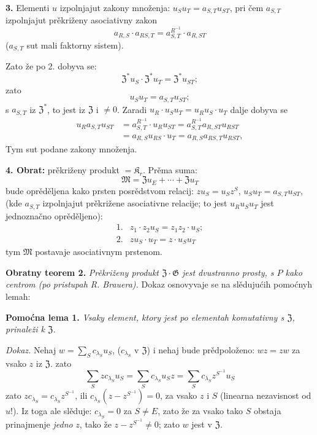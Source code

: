\documentclass[11pt]{article}
\begin{document}
\noindent\textbf{3.} Elementi \(u\) izpolnjajut zakony množenja: \(u_Su_T=a_{S,T}u_{ST}\), pri čem \(a_{S,T}\) izpolnjajut prěkriženy asociativny zakon
\[
a_{R,S}\cdot a_{RS,T}=a_{S,T}^{R^{-1}}\cdot a_{R,ST}
\]
(\(a_{S,T}\) sut mali faktorny sistem).

Zato že po 2. dobyva se:
\[
\mathfrak Z^*u_S\cdot\mathfrak Z^*u_T=\mathfrak Z^*u_{ST};
\]
zato
\[
u_Su_T=a_{S,T}u_{ST};
\]
s \(a_{S,T}\) iz \(\mathfrak Z^*\), to jest iz \(\mathfrak Z\) i \(\neq0\). Zaradi \(u_R\cdot u_Su_T=u_Ru_S\cdot u_T\) dalje dobyva se
\[
\begin{aligned}
u_Ra_{S,T}u_{ST}
&=a_{S,T}^{R^{-1}}\cdot u_Ru_{ST}
 =a_{S,T}^{R^{-1}}a_{R,ST}u_{RST}\\
&=a_{R,S}u_{RS}\cdot u_T
 =a_{R,S}a_{RS,T}u_{RST},
\end{aligned}
\]
Tym sut podane zakony množenja.

\noindent\textbf{4. Obrat:} prěkriženy produkt \(=\mathfrak K_r\). Prěma suma:
\[
\mathfrak M=\mathfrak Zu_E+\cdots+\mathfrak Zu_T
\]
bude oprěděljena kako prsten posrědstvom relacij: \(zu_S=u_Sz^S\), \(u_Su_T=a_{S,T}u_{ST}\), (kde \(a_{S,T}\) izpolnjajut prěkrižene asociativne relacije; to jest \(u_Ru_Su_T\) jest jednoznačno oprěděljeno):
\[
\begin{array}{ll}
1.&z_1\cdot z_2u_S=z_1z_2\cdot u_S;\\[2pt]
2.&zu_S\cdot u_T=z\cdot u_Su_T
\end{array}
\]
tym \(\mathfrak M\) postavaje asociativnym prstenom.

\noindent\textbf{Obratny teorem 2.} \emph{Prěkriženy produkt \(\mathfrak Z\cdot\mathfrak G\) jest dvustranno prosty, s \(P\) kako centrom (po pristupah R. Brauera).} Dokaz osnovyvaje se na slědujućih pomoćnyh lemah:

\noindent\textbf{Pomoćna lema 1.} \emph{Vsaky element, ktory jest po elementah komutativny s \(\mathfrak Z\), prinaleži k \(\mathfrak Z\).}

\noindent\emph{Dokaz.} Nehaj \(w=\sum_S c_{\lambda_S}u_S\), (\(c_{\lambda_S}\) v \(\mathfrak Z\)) i nehaj bude prědpoloženo: \(wz=zw\) za vsako \(z\) iz \(\mathfrak Z\). zato
\[
\sum_S zc_{\lambda_S}u_S
 =\sum_S c_{\lambda_S}u_Sz
 =\sum_S c_{\lambda_S}z^{S^{-1}}u_S
\]
zato \(zc_{\lambda_S}=c_{\lambda_S}z^{S^{-1}}\), ili \(c_{\lambda_S}(z-z^{S^{-1}})=0\), za vsako \(z\) i \(S\) (linearna nezavisnost od \(u\)!). Iz toga ale slěduje: \(c_{\lambda_S}=0\) za \(S\neq E\), zato že za vsako tako \(S\) obstaja prinajmenje \emph{jedno} \(z\), tako že \(z-z^{S^{-1}}\neq0\); zato \(w\) jest v \(\mathfrak Z\).
\end{document}

